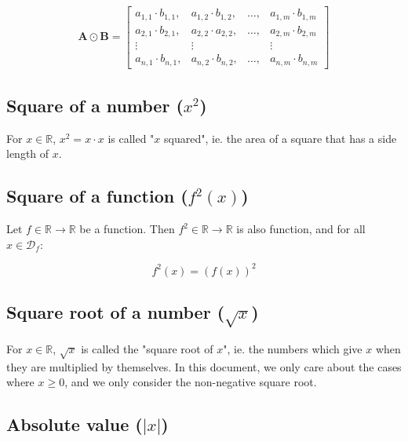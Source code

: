 \documentclass[titlepage]{article}
\begin{document}
        \begin{align*}
          \mathbf{A} \odot \mathbf{B}
            = \begin{bmatrix}
                a_{1,1} \cdot b_{1,1},
                  & a_{1,2} \cdot b_{1,2},
                  & \ldots,
                  & a_{1,m} \cdot b_{1,m} \\
                a_{2,1} \cdot b_{2,1},
                  & a_{2,2} \cdot a_{2,2},
                  & \ldots,
                  & a_{2,m} \cdot b_{2,m}\\
                \vdots & \vdots & & \vdots \\
                a_{n,1} \cdot b_{n,1},
                  & a_{n,2} \cdot b_{n,2},
                  & \ldots,
                  & a_{n,m} \cdot b_{n,m}
              \end{bmatrix}
        \end{align*}

      \subsection{Square of a number ($x^2$)}

        For $x \in \mathbb{R}$, $x^2 = x \cdot x$ is called "$x$ squared", ie.
        the area of a square that has a side length of $x$.

      \subsection{Square of a function ($f^2(x)$)}

        Let $f \in \mathbb{R} \rightarrow \mathbb{R}$ be a function. Then
        $f^2 \in \mathbb{R} \rightarrow \mathbb{R}$ is also function, and for
        all $x \in \mathcal{D}_f$:

        $$f^2(x) = \left( f(x) \right)^2$$

      \subsection{Square root of a number ($\sqrt{x}$)}

        For $x \in \mathbb{R}$, $\sqrt{x}$ is called the "square root of $x$",
        ie.  the numbers which give $x$ when they are multiplied by
        themselves. In this document, we only care about the cases where
        $x \geq 0$, and we only consider the non-negative square root.

      \subsection{Absolute value ($|x|$)}
\end{document}
